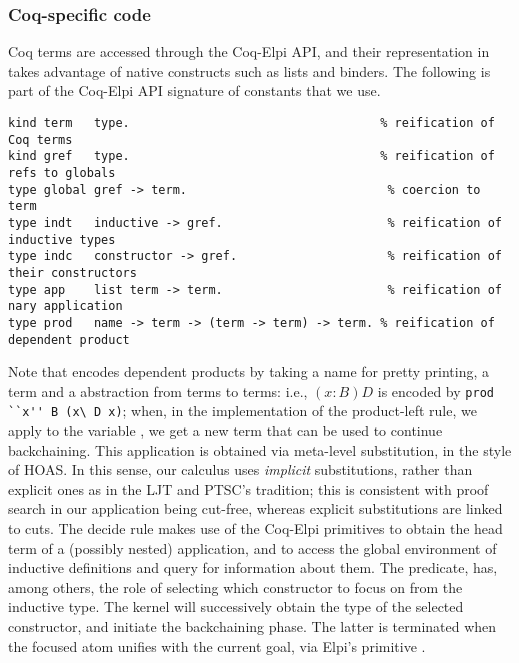 \subsubsection{Coq-specific code}
Coq terms are accessed through the Coq-Elpi API, and their representation
in \lP takes advantage of native \lP constructs such as lists and binders.
The following is part of the Coq-Elpi API signature of constants that we use.
\begin{lstlisting}[language=lprolog]
kind term   type.                                   % reification of Coq terms
kind gref   type.                                   % reification of refs to globals
type global gref -> term.                            % coercion to term
type indt   inductive -> gref.                       % reification of inductive types
type indc   constructor -> gref.                     % reification of their constructors 
type app    list term -> term.                       % reification of nary application
type prod   name -> term -> (term -> term) -> term. % reification of dependent product
\end{lstlisting}
%
Note that  encodes dependent products by taking a name for pretty
printing, a term and a \lP abstraction from terms to terms: i.e., $(x :
B) D$ is encoded by \verb|prod ``x'' B (x\ D x)|; when, in the
implementation of the product-left rule, we apply  to the variable
, we get a new term that can be used to continue backchaining. This
application is obtained via meta-level substitution, in the style of HOAS. In
this sense, our calculus uses \emph{implicit} substitutions, rather than
explicit ones as in the  LJT and PTSC's tradition; this is consistent with proof search in
our application being cut-free, whereas explicit substitutions are linked to cuts.
The decide rule makes use of the Coq-Elpi primitives
 to obtain the head term of a (possibly
nested) application, and  to access the global
environment of inductive definitions and query for information about them.
The  predicate,  has, among others, the role of selecting which
constructor to focus on from the inductive type. The kernel will successively
obtain the type of the selected constructor, and initiate the backchaining
phase. The latter is terminated when the focused atom unifies with the current goal, via
Elpi's primitive .


